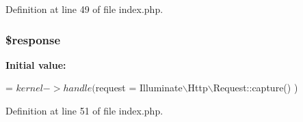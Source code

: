 Definition at line 49 of file index.\+php.

\subsubsection[{\$response}]{\setlength{\rightskip}{0pt plus 5cm}\$response}\label{index_8php_af4b6fb1bbc77ccc05f10da3b16935b99}
{\bfseries Initial value\+:}
\begin{DoxyCode}
= $kernel->handle(
    $request = Illuminate\(\backslash\)Http\(\backslash\)Request::capture()
)
\end{DoxyCode}


Definition at line 51 of file index.\+php.

